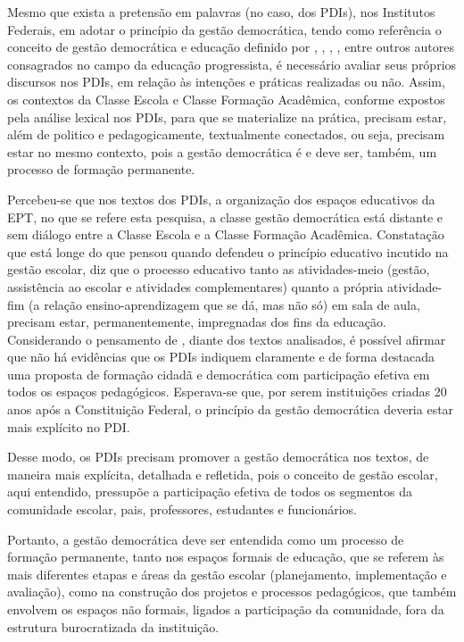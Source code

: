\documentclass[portuguese]{textolivre}
\begin{document}
Mesmo que exista a pretensão em palavras (no caso, dos PDIs), nos Institutos Federais, em adotar o princípio da gestão democrática, tendo como referência o conceito de gestão democrática e educação definido por \textcite{freire_educacao_1983,freire_professora_1993,freire_pedagogia_2000}, \textcite{luck_gestao_2006}, \textcite{paro_gestao_1998}, \textcite{veiga_escola_2013}, entre outros autores consagrados no campo da educação progressista, é necessário avaliar seus próprios discursos nos PDIs, em relação às intenções e práticas realizadas ou não. Assim, os contextos da Classe Escola e Classe Formação Acadêmica, conforme expostos pela análise lexical nos PDIs, para que se materialize na prática, precisam estar, além de politico e pedagogicamente, textualmente conectados, ou seja, precisam estar no mesmo contexto, pois a gestão democrática é e deve ser, também, um processo de formação permanente.

Percebeu-se que nos textos dos PDIs, a organização dos espaços educativos da EPT, no que se refere esta pesquisa, a classe gestão democrática está distante e sem diálogo entre a Classe Escola e a Classe Formação Acadêmica. Constatação que está longe do que pensou \textcite{paro_gestao_1998} quando defendeu o princípio educativo incutido na gestão escolar, diz que o processo educativo tanto as atividades-meio (gestão, assistência ao escolar e atividades complementares) quanto a própria atividade-fim (a relação ensino-aprendizagem que se dá, mas não só) em sala de aula, precisam estar, permanentemente, impregnadas dos fins da educação. Considerando o pensamento de \textcite{paro_gestao_1998}, diante dos textos analisados, é possível afirmar que não há evidências que os PDIs indiquem claramente e de forma destacada uma proposta de formação cidadã e democrática com participação efetiva em todos os espaços pedagógicos. Esperava-se que, por serem instituições criadas 20 anos após a Constituição Federal, o princípio da gestão democrática deveria estar mais explícito no PDI.

Desse modo, os PDIs precisam promover a gestão democrática nos textos, de maneira mais explícita, detalhada e refletida, pois o conceito de gestão escolar, aqui entendido, pressupõe a participação efetiva de todos os segmentos da comunidade escolar, pais, professores, estudantes e funcionários.

Portanto, a gestão democrática deve ser entendida como um processo de formação permanente, tanto nos espaços formais de educação, que se referem às mais diferentes etapas e áreas da gestão escolar (planejamento, implementação e avaliação), como na construção dos projetos e processos pedagógicos, que também envolvem os espaços não formais, ligados a participação da comunidade, fora da estrutura burocratizada da instituição.
\end{document}
